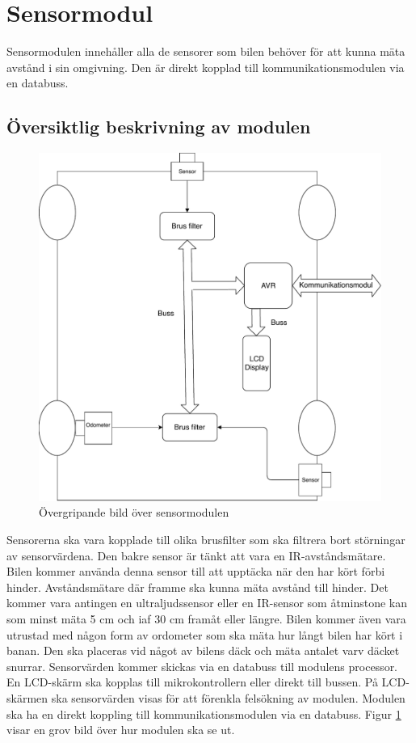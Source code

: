 \documentclass[systemskiss/skiss.tex]{subfiles}
\begin{document}
\section{Sensormodul}
Sensormodulen innehåller alla de sensorer som bilen behöver för att kunna mäta
avstånd i sin omgivning. Den är direkt kopplad till kommunikationsmodulen via
en databuss.
\subsection{Översiktlig beskrivning av modulen}
\begin{figure}[h]
    \centering
    \includegraphics[width=0.6\linewidth]{systemskiss/figures/sensormodul.pdf}
    \caption{Övergripande bild över sensormodulen}
    \label{fig:sensorskiss}
\end{figure}
\noindent Sensorerna ska vara kopplade till olika brusfilter som ska filtrera
bort störningar av sensorvärdena. Den bakre sensor är tänkt att vara en
IR-avståndsmätare. Bilen kommer använda denna sensor till att upptäcka när den
har kört förbi hinder. Avståndsmätare där framme ska kunna mäta avstånd till
hinder. Det kommer vara antingen en ultraljudssensor eller en IR-sensor som
åtminstone kan som minst mäta 5 cm och iaf 30 cm framåt eller längre. Bilen
kommer även vara utrustad med någon form av ordometer som ska mäta hur långt
bilen har kört i banan. Den ska placeras vid något av bilens däck och mäta
antalet varv däcket snurrar. Sensorvärden kommer skickas via en databuss till
modulens processor. En LCD-skärm ska kopplas till mikrokontrollern eller direkt
till bussen. På LCD-skärmen ska sensorvärden visas för att förenkla felsökning
av modulen. Modulen ska ha en direkt koppling till kommunikationsmodulen via en
databuss. Figur \ref{fig:sensorskiss} visar en grov bild över hur modulen ska
se ut.
\end{document}
